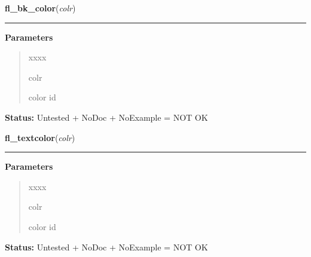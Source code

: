     \label{xformslib:library:fl_bk_color}

    \vspace{0.5ex}

\hspace{.8\funcindent}\begin{boxedminipage}{\funcwidth}

    \raggedright \textbf{fl\_bk\_color}(\textit{colr})

    \vspace{-1.5ex}

    \rule{\textwidth}{0.5\fboxrule}
\setlength{\parskip}{2ex}
\setlength{\parskip}{1ex}
      \textbf{Parameters}
      \vspace{-1ex}

      \begin{quote}
        \begin{Ventry}{xxxx}

          \item[colr]

          color id

        \end{Ventry}

      \end{quote}

\textbf{Status:} Untested + NoDoc + NoExample = NOT OK



    \end{boxedminipage}

    \label{xformslib:library:fl_textcolor}

    \vspace{0.5ex}

\hspace{.8\funcindent}\begin{boxedminipage}{\funcwidth}

    \raggedright \textbf{fl\_textcolor}(\textit{colr})

    \vspace{-1.5ex}

    \rule{\textwidth}{0.5\fboxrule}
\setlength{\parskip}{2ex}
\setlength{\parskip}{1ex}
      \textbf{Parameters}
      \vspace{-1ex}

      \begin{quote}
        \begin{Ventry}{xxxx}

          \item[colr]

          color id

        \end{Ventry}

      \end{quote}

\textbf{Status:} Untested + NoDoc + NoExample = NOT OK



    \end{boxedminipage}

